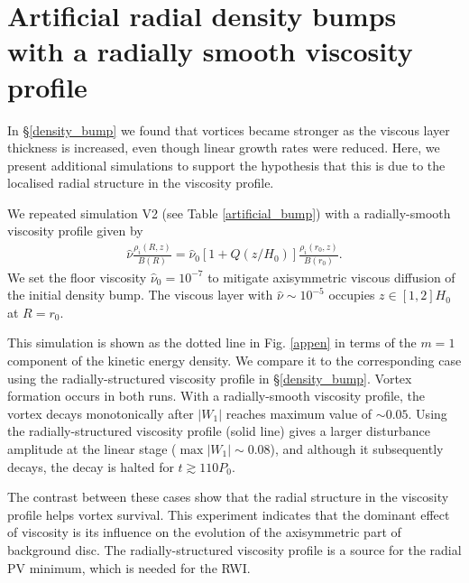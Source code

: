 {\bf
  \section{Artificial radial density bumps with a radially smooth
    viscosity profile}\label{add_sim}
  In \S\ref{density_bump} we found that vortices became stronger
  as the viscous layer thickness is increased, even though linear growth rates
  were reduced. Here, we present additional simulations to support the 
  hypothesis that this is due to the localised radial structure in the viscosity profile. 

  We repeated simulation V2 (see Table \ref{artificial_bump})
  with a radially-smooth viscosity profile given by 
  \begin{align}\label{smooth_visc}          
    \hat{\nu}\frac{\rho_i(R,z)}{B(R)} =
    \hat{\nu}_0\left[1+Q(z/H_0) \right]\frac{\rho_i(r_0,z)}{B(r_0)}. 
  \end{align}                  
  We set the floor viscosity $\hat{\nu}_0=10^{-7}$ to mitigate
  axisymmetric viscous diffusion of the initial density bump. The
  viscous layer with $\hat{\nu} \sim 10^{-5}$ occupies $z\in[1,2]H_0$
  at $R=r_0$.   
                      
  This simulation is shown as the dotted line in Fig. \ref{appen} in
  terms of the $m=1$ component of the kinetic energy density. We
  compare it to the corresponding case using the radially-structured
  viscosity profile in \S\ref{density_bump}. Vortex formation occurs
  in both runs.  
  With a radially-smooth viscosity profile, the vortex decays 
  monotonically after $|W_1|$ reaches maximum value of $\sim 0.05$. 
  Using the radially-structured viscosity profile (solid line) gives a
  larger disturbance amplitude at the linear stage  ($\max{|W_1|}\sim
  0.08$), and although it subsequently decays, the decay is halted for
  $t\gtrsim110P_0$.    

  The contrast between these cases show that the radial structure
  in the viscosity profile helps vortex survival. This experiment
  indicates that the dominant effect of viscosity is its
  influence on the evolution of the axisymmetric part of background
  disc. The radially-structured viscosity profile is a source for the
  radial PV minimum, which is needed for the RWI.  

}
